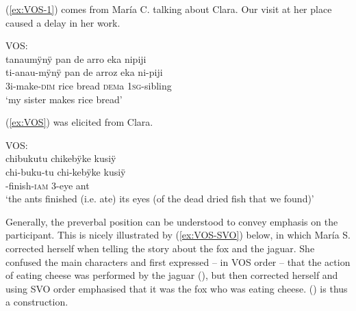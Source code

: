 (\ref{ex:VOS-1}) comes from María C. talking about Clara. Our visit at her place caused a delay in her work. 

\ea\label{ex:VOS-1}
\begingl
\glpreamble  \textup{VOS:}\\ tanaumÿnÿ pan de arro eka nipiji\\
\gla ti-anau-mÿnÿ {pan de arroz} eka ni-piji\\
\glb 3i-make-\textsc{dim} {rice bread} \textsc{dem}a 1\textsc{sg}-sibling\\
\glft ‘my sister makes rice bread’
\endgl
\trailingcitation{[cux-120410ls.227]}
\xe





(\ref{ex:VOS}) was elicited from Clara.

\ea\label{ex:VOS}
\begingl 
\glpreamble  \textup{VOS:}\\chibukutu chikebÿke kusiÿ\\
\gla chi-buku-tu chi-kebÿke kusiÿ\\ 
-finish-\textsc{iam} 3-eye ant\\ 
\glft ‘the ants finished (i.e. ate) its eyes (of the dead dried fish that we found)’
\trailingcitation{[cux-c120414ls-2.104]}
\xe


Generally, the preverbal position can be understood to convey emphasis on the participant. This is nicely illustrated by (\ref{ex:VOS-SVO}) below, in which María S. corrected herself when telling the story about the fox and the jaguar. She confused the main characters and first expressed – in VOS order – that the action of eating cheese was performed by the jaguar (), but then corrected herself and using SVO order emphasised that it was the fox who was eating cheese. () is thus a  construction.


